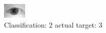 \begin{figure}[h!]
\begin{center}
\includegraphics[width=0.60\columnwidth]{figures/ID1168_class_2_target_3.png}
\end{center}
\caption{ Classification: 2 actual target: 3}
\label{fig:ID1168_class_2_target_3}
\end{figure}
